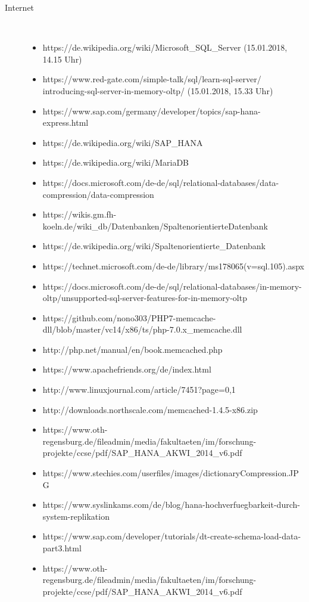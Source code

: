 \documentclass[a4paper, 12pt]{scrartcl}
\begin{document}
\begin{description}
	\item[Internet]~\par 
	\begin{itemize}
		\item https://de.wikipedia.org/wiki/Microsoft_SQL_Server (15.01.2018, 14.15 Uhr)		
		\item https://www.red-gate.com/simple-talk/sql/learn-sql-server/\\introducing-sql-server-in-memory-oltp/ (15.01.2018, 15.33 Uhr)
		\item https://www.sap.com/germany/developer/topics/sap-hana-express.html 
		\item https://de.wikipedia.org/wiki/SAP_HANA
		\item https://de.wikipedia.org/wiki/MariaDB
		\item https://docs.microsoft.com/de-de/sql/relational-databases/data-compression/data-compression
		\item https://wikis.gm.fh-koeln.de/wiki_db/Datenbanken/SpaltenorientierteDatenbank
		\item https://de.wikipedia.org/wiki/Spaltenorientierte_Datenbank
		\item https://technet.microsoft.com/de-de/library/ms178065(v=sql.105).aspx
		\item https://docs.microsoft.com/de-de/sql/relational-databases/in-memory-oltp/unsupported-sql-server-features-for-in-memory-oltp
		\item https://github.com/nono303/PHP7-memcache-dll/blob/master/vc14/x86/ts/php-7.0.x_memcache.dll
		\item http://php.net/manual/en/book.memcached.php
		\item https://www.apachefriends.org/de/index.html
		\item http://www.linuxjournal.com/article/7451?page=0,1
		\item http://downloads.northscale.com/memcached-1.4.5-x86.zip
		\item https://www.oth-regensburg.de/fileadmin/media/fakultaeten/im/forschung-projekte/ccse/pdf/SAP_HANA_AKWI_2014_v6.pdf
		\item https://www.stechies.com/userfiles/images/dictionaryCompression.JPG
		\item https://www.syslinkams.com/de/blog/hana-hochverfuegbarkeit-durch-system-replikation
		\item https://www.sap.com/developer/tutorials/dt-create-schema-load-data-part3.html
		\item https://www.oth-regensburg.de/fileadmin/media/fakultaeten/im/forschung-projekte/ccse/pdf/SAP_HANA_AKWI_2014_v6.pdf

\end{itemize}
\end{description}
\end{document}
